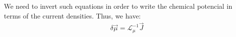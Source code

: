 We need to invert such equations in order to write the chemical potencial in terms of the current densities. Thus, we have:
\begin{align*}
\delta\vec{\mu}=\boldsymbol{\mathcal{L}}_{\mu}^{-1}\vec{J}
\end{align*}



